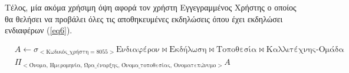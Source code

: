 Τέλος, μία ακόμα χρήσιμη όψη αφορά τον χρήστη Εγγεγραμμένος Χρήστης ο
οποίος θα θελήσει να προβάλει όλες τις αποθηκευμένες εκδηλώσεις όπου
έχει εκδηλώσει ενδιαφέρων (\ref{eq6}).


\begin{equation}
  \label{eq6}
  \begin{split}
    &A \leftarrow \sigma_{<\text{Κωδικός\_χρήστη} = 8055>}
    \text{Ενδιαφέρον} \bowtie \text{Εκδήλωση} \bowtie \text{Τοποθεσία}
    \bowtie \text{Καλλιτέχνης-Ομάδα} \\
    &\Pi_{<\text{Όνομα, Ημερομηνία, Ώρα\_έναρξης, Όνομα\_τοποθεσίας,
        Ονοματεπώνυμο}>}A
  \end{split}
\end{equation}


